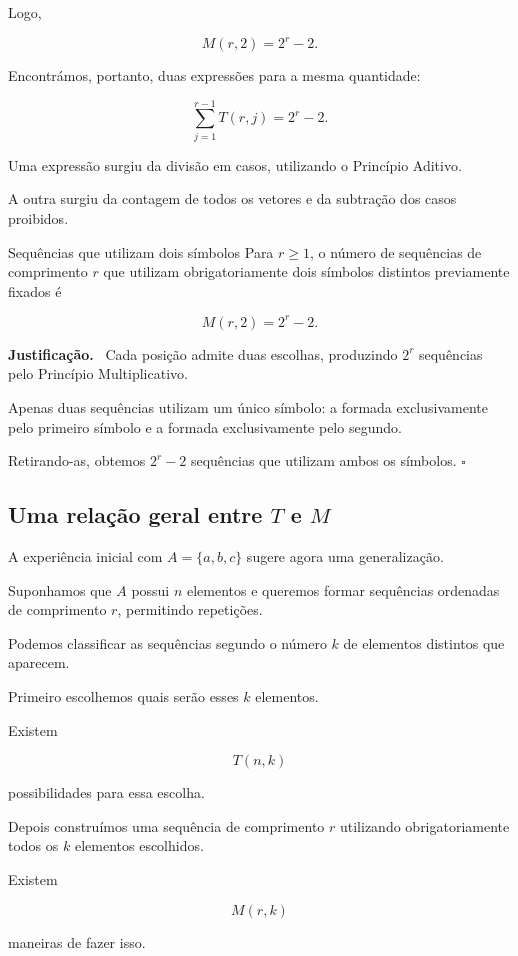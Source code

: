 \documentclass[11pt,a4paper,oneside]{book}
\newcommand{\prova}{\textbf{Justificação.}\ }
\newcommand{\fimprova}{\hfill$\square$}
\begin{document}
Logo,

\[
\boxed{M(r,2)=2^r-2}.
\]

Encontrámos, portanto, duas expressões
para a mesma quantidade:

\[
\boxed{
\sum_{j=1}^{r-1}T(r,j)=2^r-2
}.
\]

Uma expressão surgiu da divisão em casos,
utilizando o Princípio Aditivo.

A outra surgiu da contagem de todos os vetores
e da subtração dos casos proibidos.

\begin{teoremabox}{Sequências que utilizam dois símbolos}
Para $r\geq1$, o número de sequências
de comprimento $r$ que utilizam obrigatoriamente
dois símbolos distintos previamente fixados é

\[
\boxed{M(r,2)=2^r-2}.
\]

\prova
Cada posição admite duas escolhas, produzindo
$2^r$ sequências pelo Princípio Multiplicativo.

Apenas duas sequências utilizam um único
símbolo: a formada exclusivamente pelo
primeiro símbolo e a formada exclusivamente
pelo segundo.

Retirando-as, obtemos $2^r-2$ sequências
que utilizam ambos os símbolos.
\fimprova
\end{teoremabox}

\subsection*{Uma relação geral entre $T$ e $M$}

A experiência inicial com $A=\{a,b,c\}$
sugere agora uma generalização.

Suponhamos que $A$ possui $n$ elementos
e queremos formar sequências ordenadas
de comprimento $r$, permitindo repetições.

Podemos classificar as sequências segundo
o número $k$ de elementos distintos que aparecem.

Primeiro escolhemos quais serão esses
$k$ elementos.

Existem

\[
T(n,k)
\]

possibilidades para essa escolha.

Depois construímos uma sequência de
comprimento $r$ utilizando obrigatoriamente
todos os $k$ elementos escolhidos.

Existem

\[
M(r,k)
\]

maneiras de fazer isso.
\end{document}
